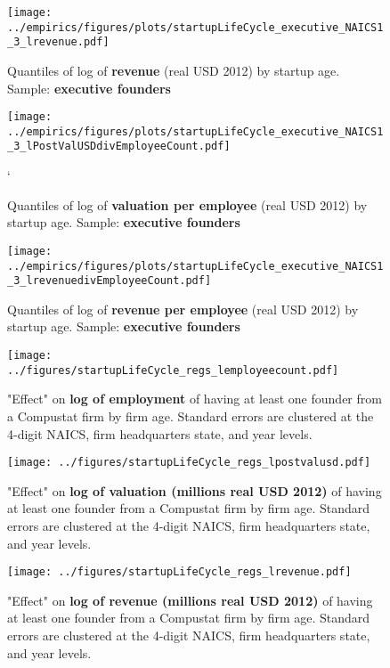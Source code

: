\documentclass[12pt,english]{article}
\theoremstyle{remark}
\begin{document}
\begin{figure}[!htb]
	\centering
	\texttt{[image: ../empirics/figures/plots/startupLifeCycle\_executive\_NAICS1\_3\_lrevenue.pdf]}
	\caption{Quantiles of log of \textbf{revenue} (real USD 2012) by startup age. 
		Sample: \textbf{executive founders}}
\end{figure}

\begin{figure}[!htb]
	\centering
	\texttt{[image: ../empirics/figures/plots/startupLifeCycle\_executive\_NAICS1\_3\_lPostValUSDdivEmployeeCount.pdf]}
	\caption{Quantiles of log of \textbf{valuation per employee} (real USD 2012) by startup age. 
		Sample: \textbf{executive founders}}`
\end{figure}

\begin{figure}[!htb]
	\centering
	\texttt{[image: ../empirics/figures/plots/startupLifeCycle\_executive\_NAICS1\_3\_lrevenuedivEmployeeCount.pdf]}
	\caption{Quantiles of log of \textbf{revenue per employee} (real USD 2012) by startup age. 
		Sample: \textbf{executive founders}}
\end{figure}




%	


\begin{figure}
	\texttt{[image: ../figures/startupLifeCycle\_regs\_lemployeecount.pdf]}
	\caption{"Effect" on \textbf{log of employment} of having at least one founder from a Compustat firm by firm age. Standard errors are clustered at the 4-digit NAICS, firm headquarters state, and year levels.}
\end{figure}

\begin{figure}
	\texttt{[image: ../figures/startupLifeCycle\_regs\_lpostvalusd.pdf]}
	\caption{"Effect" on \textbf{log of valuation (millions real USD 2012)} of having at least one founder from a Compustat firm by firm age. Standard errors are clustered at the 4-digit NAICS, firm headquarters state, and year levels.}
\end{figure}

\begin{figure}
	\texttt{[image: ../figures/startupLifeCycle\_regs\_lrevenue.pdf]}
	\caption{"Effect" on \textbf{log of revenue (millions real USD 2012)} of having at least one founder from a Compustat firm by firm age. Standard errors are clustered at the 4-digit NAICS, firm headquarters state, and year levels.}
\end{figure}
\end{document}
